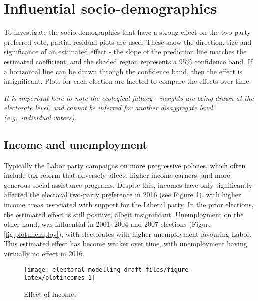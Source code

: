 \documentclass[openany]{book}
\begin{document}
\hypertarget{influential-socio-demographics}{%
\section{Influential socio-demographics}\label{influential-socio-demographics}}

To investigate the socio-demographics that have a strong effect on the two-party preferred vote, partial residual plots are used. These show the direction, size and significance of an estimated effect - the slope of the prediction line matches the estimated coefficient, and the shaded region represents a 95\% confidence band. If a horizontal line can be drawn through the confidence band, then the effect is insignificant. Plots for each election are faceted to compare the effects over time.

\emph{It is important here to note the ecological fallacy - insights are being drawn at the electorate level, and cannot be inferred for another disaggregate level (e.g.~individual voters).}

\hypertarget{income-and-unemployment}{%
\subsection{Income and unemployment}\label{income-and-unemployment}}

Typically the Labor party campaigns on more progressive policies, which often include tax reform that adversely affects higher income earners, and more generous social assistance programs. Despite this, incomes have only significantly affected the electoral two-party preference in 2016 (see Figure \ref{fig:plotincomes}), with higher income areas associated with support for the Liberal party. In the prior elections, the estimated effect is still positive, albeit insignificant. Unemployment on the other hand, was influential in 2001, 2004 and 2007 elections (Figure \ref{fig:plotunemploy}), with electorates with higher unemployment favouring Labor. This estimated effect has become weaker over time, with unemployment having virtually no effect in 2016.

\begin{figure}[h]

{\centering \texttt{[image: electoral-modelling-draft\_files/figure-latex/plotincomes-1]} 

}

\caption{Effect of Incomes}\label{fig:plotincomes}
\end{figure}
\end{document}
